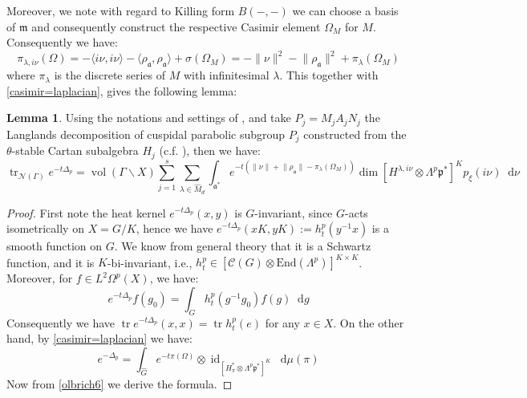 \documentclass[11pt]{report}
\theoremstyle{definition}
\newtheorem{Lemma}[Def]{Lemma}
\theoremstyle{plain}
\DeclareMathOperator{\tr}{tr}
\DeclareMathOperator{\id}{id}
\DeclareMathOperator{\vol}{vol}
\newcommand{\vna}{\mathcal{N}}
\newcommand{\brac}[1]{\langle #1 \rangle}
\renewcommand{\hat}{\widehat}
\newcommand{\norm}[1]{\lVert #1 \rVert}
\newcommand{\mass}[1]{\mathop{}\mathrm{d}{#1}}
\newcommand{\Lie}[1]{\mathfrak{#1}}
\begin{document}
Moreover, we note with regard to Killing form $B(-,-)$ we can choose a basis of $\Lie{m}$ and consequently construct the respective Casimir element $\Omega_M$ for $M$. Consequently we have:
\begin{equation}\label{olbrich6}
\pi_{\lambda, i\nu}(\Omega)=-\brac{i\nu, i\nu}-\brac{\rho_{\Lie{a}}, \rho_{\Lie{a}}}+\sigma(\Omega_M)=-\norm{\nu}^2-\norm{\rho_{\Lie{a}}}^2+\pi_{\lambda}(\Omega_M)
\end{equation}
where $\pi_{\lambda}$ is the discrete series of $M$ with infinitesimal $\lambda$. This together with \ref{casimir=laplacian}, gives the following lemma:
\begin{Lemma}\label{olbrich2.3}
	Using the notations and settings of , and take $P_j=M_jA_jN_j$ the Langlands decomposition of cuspidal parabolic subgroup $P_j$ constructed from the $\theta$-stable Cartan subalgebra $H_j$ (c.f. ), then we have:
	\begin{equation}
	\tr_{\vna(\Gamma)}e^{-t\Delta_p}=\vol(\Gamma\backslash X) \sum_{j=1}^s\sum_{\lambda\in \hat{M}_d}\int_{\Lie{a}^*}e^{-t(\norm{\nu}+\norm{\rho_{\Lie{a}}}-\pi_\lambda(\Omega_M))}\dim[H^{\lambda, i\nu}\otimes \Lambda^p\Lie{p}^*]^Kp_\xi(i\nu)\mass{\nu}
	\end{equation}
\end{Lemma}
\begin{proof}
	First note the heat kernel $e^{-t\Delta_p}(x,y)$ is $G$-invariant, since $G$-acts isometrically on $X=G/K$, hence we have $e^{-t\Delta_p}(xK, yK):=h_t^p(y^{-1}x)$ is a smooth function on $G$. We know from general theory that it is a Schwartz function, and it is $K$-bi-invariant,  i.e., $h_t^p\in [\mathcal{C}(G)\otimes \mathrm{End}(\Lambda^p)]^{K\times K}$. Moreover, for $f\in L^2\Omega^p(X)$, we have:
	\begin{equation}
	e^{-t\Delta_p}f(g_0)=\int_G h_t^p(g^{-1}g_0)f(g)\mass{g}
	\end{equation}
	Consequently we have $\tr e^{-t\Delta_p}(x,x)=\tr h_t^p(e)$ for any $x\in X$. On the other hand, by \ref{casimir=laplacian} we have:
	\begin{equation}
	e^{-\Delta_p}=\int_{\hat{G}}^{}e^{-t\pi(\Omega)}\otimes \id_{[H^*_\pi\otimes \Lambda^p\Lie{p}^*]^K}\mass{\mu(\pi)}
	\end{equation}
	Now from \ref{olbrich6} we derive the formula.
\end{proof}
\end{document}
